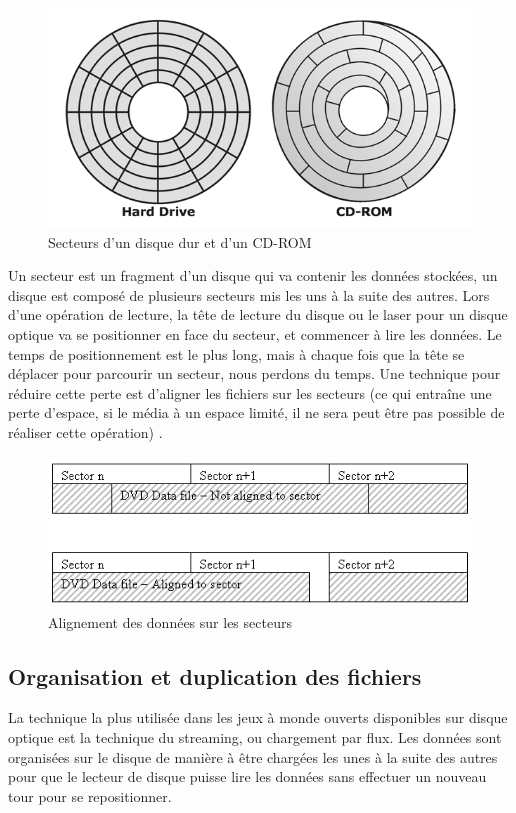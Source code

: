\documentclass[a4paper, 12pt]{article} %
\begin{document}
\begin{figure}[!h]%
\begin{center} 
\includegraphics[width=0.60\columnwidth]{images/disk_sector.png}%
\caption{Secteurs d'un disque dur et d'un CD-ROM}%
\label{}%
\end{center}
\end{figure}

Un secteur est un fragment d'un disque qui va contenir les données stockées, un disque est composé de plusieurs secteurs mis les uns à la suite des autres. Lors d'une opération de lecture, la tête de lecture du disque ou le laser pour un disque optique va se positionner en face du secteur, et commencer à lire les données. Le temps de positionnement est le plus long, mais à chaque fois que la tête se déplacer pour parcourir un secteur, nous perdons du temps. 
Une technique pour réduire cette perte est d'aligner les fichiers sur les secteurs (ce qui entraîne une perte d'espace, si le média à un espace limité, il ne sera peut être pas possible de réaliser cette opération) \cite{industry:streaming-for-loading}.

\begin{figure}[!h]%
\begin{center} 
\includegraphics[width=0.60\columnwidth]{images/sector_storage.png}%
\caption{Alignement des données sur les secteurs}%
\label{}%
\end{center}
\end{figure}

\newpage
\subsection{Organisation et duplication des fichiers}
La technique la plus utilisée dans les jeux à monde ouverts disponibles sur disque optique est la technique du streaming, ou chargement par flux. Les données sont organisées sur le disque de manière à être chargées les unes à la suite des autres pour que le lecteur de disque puisse lire les données sans effectuer un nouveau tour pour se repositionner.
\end{document}
